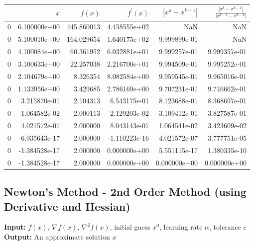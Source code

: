 \begin{tabular}{lrrrrr}
\toprule
{} &           $x$ &      $f(x)$ &  $f^\prime(x)$ &  $|x^k - x^{k-1}|$ &  $\frac{|x^ k - x^{k-1}|}{|x^{k-1} - x^{k-2}|}$ \\
\midrule
0 &  6.100000e+00 &  445.860013 &   4.458555e+02 &                NaN &                                            NaN \\
0 &  5.100010e+00 &  164.029654 &   1.640175e+02 &       9.999899e-01 &                                            NaN \\
0 &  4.100084e+00 &   60.361952 &   6.032881e+01 &       9.999257e-01 &                                   9.999357e-01 \\
0 &  3.100633e+00 &   22.257038 &   2.216700e+01 &       9.994509e-01 &                                   9.995252e-01 \\
0 &  2.104679e+00 &    8.326354 &   8.082584e+00 &       9.959545e-01 &                                   9.965016e-01 \\
0 &  1.133956e+00 &    3.429685 &   2.786169e+00 &       9.707231e-01 &                                   9.746662e-01 \\
0 &  3.215870e-01 &    2.104313 &   6.543175e-01 &       8.123688e-01 &                                   8.368697e-01 \\
0 &  1.064582e-02 &    2.000113 &   2.129203e-02 &       3.109412e-01 &                                   3.827587e-01 \\
0 &  4.021572e-07 &    2.000000 &   8.043143e-07 &       1.064541e-02 &                                   3.423609e-02 \\
0 & -6.935643e-17 &    2.000000 &  -1.110223e-16 &       4.021572e-07 &                                   3.777751e-05 \\
0 & -1.384528e-17 &    2.000000 &   0.000000e+00 &       5.551115e-17 &                                   1.380335e-10 \\
0 & -1.384528e-17 &    2.000000 &   0.000000e+00 &       0.000000e+00 &                                   0.000000e+00\\
\hline
\end{tabular}


\subsection{Newton's Method - 2nd Order Method (using Derivative and Hessian)}

\textbf{Input:} $f(x)$, $\nabla f(x)$, $\nabla^2f(x)$, initial guess $x^0$, learning rate $\alpha$, tolerance $\epsilon$\\
\textbf{Output:} An approximate solution $x$

